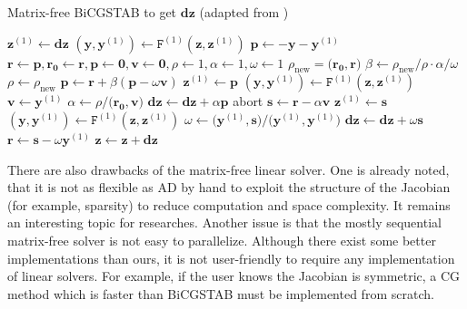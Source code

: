 \documentclass[11pt]{scrartcl}
\newcommand{\vect}[1]{\boldsymbol{#1}}
\begin{document}
\begin{algorithm}[H]
	\caption{Matrix-free BiCGSTAB to get $\vect{dz}$ (adapted from \cite{naumann})}\label{algo:bicgstab}
	\small{	\begin{algorithmic}
			\State $\vect{z}^{(1)} \gets \vect{dz}$ 
			\State \color{blue}$(\vect{y}, \vect{y}^{(1)}) \gets \mathtt{F}^{(1)} (\vect{z}, \vect{z}^{(1)}) $ \normalcolor {}
			\State $\vect{p} \gets -\vect{y} -\vect{y}^{(1)}$
			\State $\vect{r} \gets \vect{p}, \vect{r_0}\gets \vect{r},\vect{p}\gets \vect{0},\vect{v}\gets \vect{0}, \rho\gets1,\alpha\gets1,\omega\gets1 $
			\While{$\lVert \vect{r} \rVert > \textsc{tol}$} 
			\State $\rho_{\text{new}} = \big(\vect{r_0},\vect{r}\big)$
			\State $\beta \gets \rho_{\text{new}}/\rho \cdot \alpha/\omega$
			\State $\rho \gets \rho_{\text{new}}$
			\State $\vect{p}\gets \vect{r}+\beta(\vect{p}-\omega \vect{v})$
			\State $\vect{z}^{(1)} \gets \vect{p}$
			\State \color{blue}$(\vect{y}, \vect{y}^{(1)}) \gets \mathtt{F}^{(1)} (\vect{z}, \vect{z}^{(1)}) $ \normalcolor {}
			\State $\vect{v}\gets \vect{y}^{(1)}$
			\State $\alpha \gets \rho/\big(\vect{r_0},\vect{v}\big)$ 
			\State $\vect{dz} \gets \vect{dz} + \alpha \vect{p}$
			\If{$\lVert \mathtt{F}(\vect{z}+\vect{dz}) \rVert < \textsc{tol} $}
			\State abort 
			\EndIf
			\State $\vect{s}\gets \vect{r} - \alpha \vect{v}$
			\State $\vect{z}^{(1)} \gets \vect{s}$
			\State \color{blue}$(\vect{y}, \vect{y}^{(1)}) \gets \mathtt{F}^{(1)} (\vect{z}, \vect{z}^{(1)}) $ \normalcolor {}
			\State $\omega \gets \big(\vect{y}^{(1)}, \vect{s} \big) / \big(\vect{y}^{(1)}, \vect{y}^{(1)} \big)$
			\State $\vect{dz} \gets \vect{dz} + \omega \vect{s}$
			\State $\vect{r} \gets \vect{s} - \omega \vect{y}^{(1)}$
			\EndWhile
			\State $\vect{z} \gets \vect{z} + \vect{dz}$
	\end{algorithmic}}
\end{algorithm}

There are also drawbacks of the matrix-free linear solver. One is already noted, that it is not as flexible as AD by hand to exploit the structure of the Jacobian (for example, sparsity) to reduce computation and space complexity. It remains an interesting topic for researches. Another issue is that the mostly sequential matrix-free solver is not easy to parallelize. Although there exist some better implementations than ours, it is not user-friendly to require any implementation of linear solvers. For example, if the user knows the Jacobian is symmetric, a CG method which is faster than BiCGSTAB must be implemented from scratch.
\end{document}
